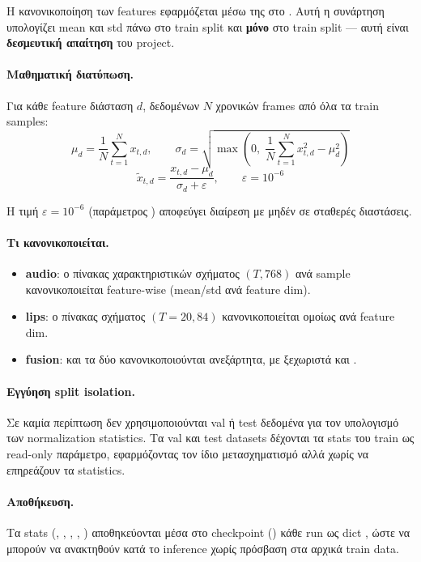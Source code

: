 Η κανονικοποίηση των features εφαρμόζεται μέσω
της  στο
.
Αυτή η συνάρτηση υπολογίζει mean και std
πάνω στο train split και \textbf{μόνο} στο train split —
αυτή είναι \textbf{δεσμευτική απαίτηση} του project.

\paragraph{Μαθηματική διατύπωση.}
Για κάθε feature διάσταση $d$, δεδομένων $N$ χρονικών frames
από όλα τα train samples:
\[
  \mu_d = \frac{1}{N}\sum_{t=1}^{N} x_{t,d},
  \qquad
  \sigma_d = \sqrt{\max\!\left(0,\; \frac{1}{N}\sum_{t=1}^{N} x_{t,d}^2 - \mu_d^2\right)}
\]
\[
  \tilde{x}_{t,d} = \frac{x_{t,d} - \mu_d}{\sigma_d + \varepsilon},
  \qquad \varepsilon = 10^{-6}
\]

Η τιμή $\varepsilon = 10^{-6}$ (παράμετρος )
αποφεύγει διαίρεση με μηδέν σε σταθερές διαστάσεις.

\paragraph{Τι κανονικοποιείται.}
\begin{itemize}
  \item \textbf{audio}: ο πίνακας χαρακτηριστικών
        σχήματος $(T, 768)$ ανά sample κανονικοποιείται
        feature-wise (mean/std ανά feature dim).
  \item \textbf{lips}: ο πίνακας σχήματος $(T{=}20, 84)$
        κανονικοποιείται ομοίως ανά feature dim.
  \item \textbf{fusion}: και τα δύο κανονικοποιούνται
        ανεξάρτητα, με ξεχωριστά 
        και .
\end{itemize}

\paragraph{Εγγύηση split isolation.}
Σε καμία περίπτωση δεν χρησιμοποιούνται val ή test δεδομένα
για τον υπολογισμό των normalization statistics.
Τα val και test datasets δέχονται τα stats του train
ως read-only παράμετρο,
εφαρμόζοντας τον ίδιο μετασχηματισμό αλλά
χωρίς να επηρεάζουν τα statistics.

\paragraph{Αποθήκευση.}
Τα stats (, ,
, , )
αποθηκεύονται μέσα στο checkpoint ()
κάθε run ως dict ,
ώστε να μπορούν να ανακτηθούν κατά το inference
χωρίς πρόσβαση στα αρχικά train data.

